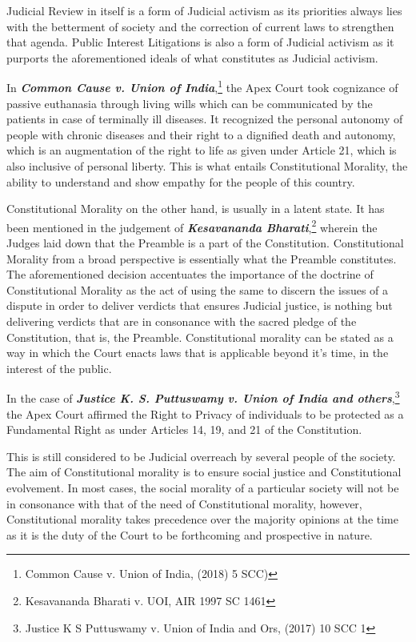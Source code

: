 \begin{multicols}{2}
\noi
Judicial Review in itself is a form of Judicial activism as its priorities always lies with the
betterment of society and the correction of current laws to strengthen that agenda. Public Interest Litigations is also a form of Judicial activism as it purports the aforementioned ideals
of what constitutes as Judicial activism. 

\noi
In \textbf{\textit{Common Cause v. Union of India}},\footnote{Common Cause v. Union of India, (2018) 5 SCC)}  the Apex Court took cognizance of passive
euthanasia through living wills which can be communicated by the patients in case of
terminally ill diseases. It recognized the personal autonomy of people with chronic diseases
and their right to a dignified death and autonomy, which is an augmentation of the right to
life as given under Article 21, which is also inclusive of personal liberty. This is what entails
Constitutional Morality, the ability to understand and show empathy for the people of this
country. 

\newpage

\noi
Constitutional Morality on the other hand, is usually in a latent state. It has been mentioned in
the judgement of \textbf{\textit{Kesavananda Bharati}},\footnote{Kesavananda Bharati v. UOI, AIR 1997 SC 1461 } wherein the Judges laid down that the Preamble is
a part of the Constitution. Constitutional Morality from a broad perspective is essentially
what the Preamble constitutes. The aforementioned decision accentuates the importance of
the doctrine of Constitutional Morality as the act of using the same to discern the issues of a
dispute in order to deliver verdicts that ensures Judicial justice, is nothing but delivering
verdicts that are in consonance with the sacred pledge of the Constitution, that is, the
Preamble. Constitutional morality can be stated as a way in which the Court enacts laws that
is applicable beyond it’s time, in the interest of the public. 

\noi
In the case of \textbf{\textit{Justice K. S. Puttuswamy v. Union of India and others}},\footnote{Justice K S Puttuswamy v. Union of India and Ors, (2017) 10 SCC 1} the Apex Court
affirmed the Right to Privacy of individuals to be protected as a Fundamental Right as under
Articles 14, 19, and 21 of the Constitution.

\noi
This is still considered to be Judicial overreach by several people of the society. The aim of
Constitutional morality is to ensure social justice and Constitutional evolvement. In most
cases, the social morality of a particular society will not be in consonance with that of the
need of Constitutional morality, however, Constitutional morality takes precedence over the
majority opinions at the time as it is the duty of the Court to be forthcoming and prospective
in nature.


\end{multicols}
